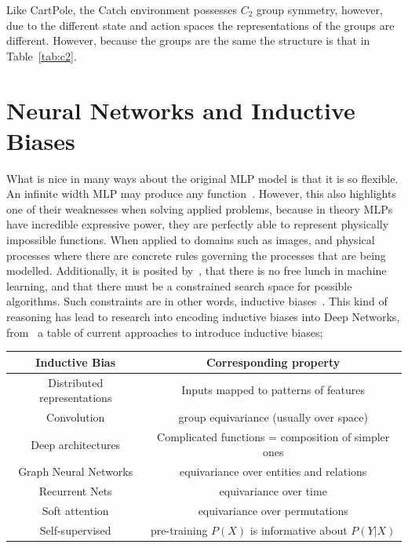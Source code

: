 Like CartPole, the Catch environment possesses $C_2$ group symmetry, however, due to the different state and action spaces the representations of the groups are different. However, because the groups are the same the structure is that in Table~\ref{tab:c2}.



\section{Neural Networks and Inductive Biases}

What is nice in many ways about the original MLP model is that it is so flexible. An infinite width MLP may produce any function~\cite{hornik1989multilayer}. However, this also highlights one of their weaknesses when solving applied problems, because in theory MLPs have incredible expressive power, they are perfectly able to represent physically impossible functions. When applied to domains such as images, and physical processes where there are concrete rules governing the processes that are being modelled. Additionally, it is posited by~\cite{wolpert1995no}, that there is no free lunch in machine learning, and that there must be a constrained search space for possible algorithms. Such constraints are in other words, inductive biases~\cite{baxter2000model}. This kind of reasoning has lead to research into encoding inductive biases into Deep Networks, from~\cite{goyal2022inductive} a table of current approaches to introduce inductive biases;

\begin{table}
	\centering
	\begin{tabular}{|c | c|}
		\hline
		Inductive Bias              & Corresponding property                              \\
		\hline
		\hline
		Distributed representations & Inputs mapped to patterns of features               \\
		\hline
		Convolution                 & group equivariance (usually over space)             \\
		\hline
		Deep architectures          & Complicated functions = composition of simpler ones \\
		\hline
		Graph Neural Networks       & equivariance over entities and relations            \\
		\hline
		Recurrent Nets              & equivariance over time                              \\
		\hline
		Soft attention              & equivariance over permutations                      \\
		\hline
		Self-supervised             & pre-training $P(X)$ is informative about $P(Y |X)$  \\
		\hline
	\end{tabular}
\end{table}

